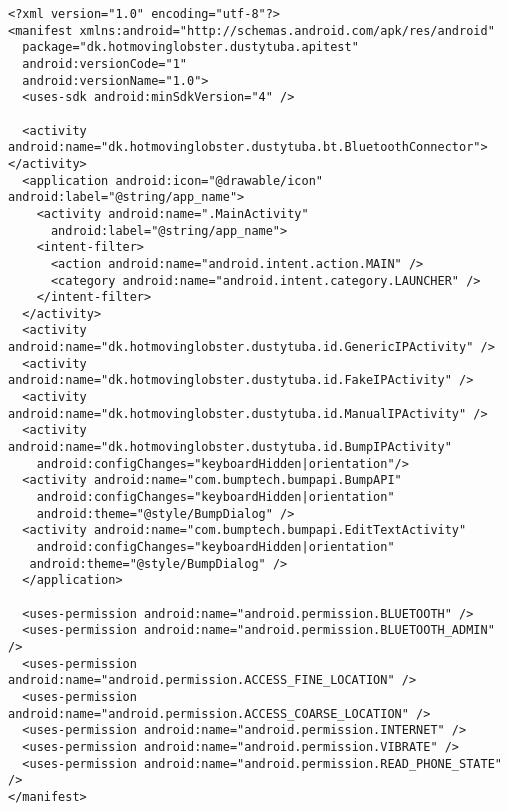 \documentclass[a4paper,11pt]{article}
\begin{document}
\footnotesize
\begin{verbatim}
<?xml version="1.0" encoding="utf-8"?>
<manifest xmlns:android="http://schemas.android.com/apk/res/android"
  package="dk.hotmovinglobster.dustytuba.apitest"
  android:versionCode="1"
  android:versionName="1.0">
  <uses-sdk android:minSdkVersion="4" />

  <activity android:name="dk.hotmovinglobster.dustytuba.bt.BluetoothConnector"></activity>
  <application android:icon="@drawable/icon" android:label="@string/app_name">
    <activity android:name=".MainActivity"
      android:label="@string/app_name">
    <intent-filter>
      <action android:name="android.intent.action.MAIN" />
      <category android:name="android.intent.category.LAUNCHER" />
    </intent-filter>
  </activity>
  <activity android:name="dk.hotmovinglobster.dustytuba.id.GenericIPActivity" />
  <activity android:name="dk.hotmovinglobster.dustytuba.id.FakeIPActivity" />
  <activity android:name="dk.hotmovinglobster.dustytuba.id.ManualIPActivity" />
  <activity android:name="dk.hotmovinglobster.dustytuba.id.BumpIPActivity"
    android:configChanges="keyboardHidden|orientation"/>
  <activity android:name="com.bumptech.bumpapi.BumpAPI"
    android:configChanges="keyboardHidden|orientation"
    android:theme="@style/BumpDialog" />
  <activity android:name="com.bumptech.bumpapi.EditTextActivity"
    android:configChanges="keyboardHidden|orientation"
   android:theme="@style/BumpDialog" />
  </application>
  
  <uses-permission android:name="android.permission.BLUETOOTH" />
  <uses-permission android:name="android.permission.BLUETOOTH_ADMIN" />  
  <uses-permission android:name="android.permission.ACCESS_FINE_LOCATION" />
  <uses-permission android:name="android.permission.ACCESS_COARSE_LOCATION" />
  <uses-permission android:name="android.permission.INTERNET" />
  <uses-permission android:name="android.permission.VIBRATE" />
  <uses-permission android:name="android.permission.READ_PHONE_STATE" />
</manifest>
\end{verbatim}
\normalsize
\end{document}
